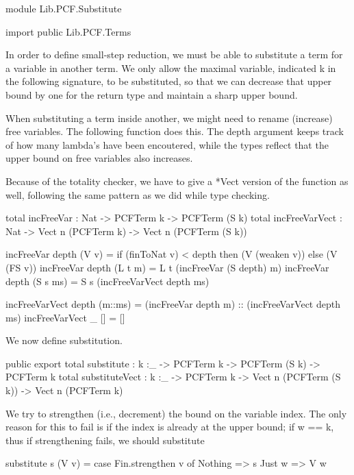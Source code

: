 \begin{hidden}
module Lib.PCF.Substitute

import public Lib.PCF.Terms
\end{hidden}

In order to define small-step reduction, we must be able to substitute a term
for a variable in another term.
We only allow the maximal variable, indicated k in the following signature, to be substituted,
so that we can decrease that upper bound by one for the return type and maintain a sharp upper bound.

When substituting a term inside another, we might need to rename (increase)
free variables. The following function does this.
The depth argument keeps track of how many lambda's have been encoutered,
while the types reflect that the upper bound on free variables also increases.

Because of the totality checker, we have to give a *Vect version of the function as well, following
the same pattern as we did while type checking.

\begin{code}
total incFreeVar : Nat -> PCFTerm k -> PCFTerm (S k)
total incFreeVarVect : Nat -> Vect n (PCFTerm k) -> Vect n (PCFTerm (S k))

incFreeVar depth (V v)    = if (finToNat v) < depth
                              then (V (weaken v))
                            else (V (FS v))
incFreeVar depth (L t m)  = L t (incFreeVar (S depth) m)
incFreeVar depth (S s ms) = S s (incFreeVarVect depth ms)

incFreeVarVect depth (m::ms) = (incFreeVar depth m) :: (incFreeVarVect depth ms)
incFreeVarVect _     []      = []
\end{code}

We now define substitution.

\begin{code}
public export
total substitute : {k :_} -> PCFTerm k -> PCFTerm (S k) -> PCFTerm k
total substituteVect : {k :_} -> PCFTerm k -> Vect n (PCFTerm (S k)) -> Vect n (PCFTerm k)
\end{code}

We try to strengthen (i.e., decrement) the bound on the variable index.
The only reason for this to fail is if the index is already at the upper bound; if w == k, thus
if strengthening fails, we should substitute

\begin{code}
substitute s (V v) =  case Fin.strengthen v of
                        Nothing => s
                        Just w  => V w
\end{code}

